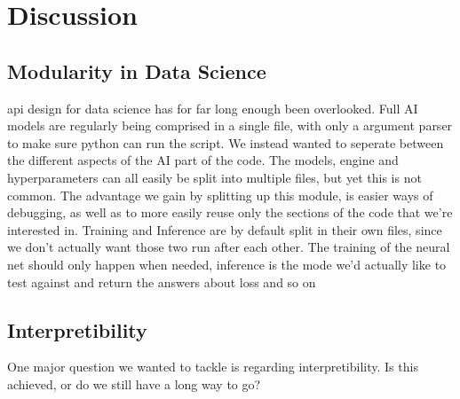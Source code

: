 \chapter{Discussion}
\label{chap:discussion}

\section{Modularity in Data Science}

api design for data science has for far long enough been overlooked. Full AI models are regularly being comprised in a single file, with only a argument parser to make sure python can run the script. We instead wanted to seperate between the different aspects of the AI part of the code. The models, engine and hyperparameters can all easily be split into multiple files, but yet this is not common. The advantage we gain by splitting up this module, is easier ways of debugging, as well as to more easily reuse only the sections of the code that we're interested in. Training and Inference are by default split in their own files, since we don't actually want those two run after each other. The training of the neural net should only happen when needed, inference is the mode we'd actually like to test against and return the answers about loss and so on 


\section{Interpretibility}
One major question we wanted to tackle is regarding interpretibility. Is this achieved, or do we still have a long way to go?